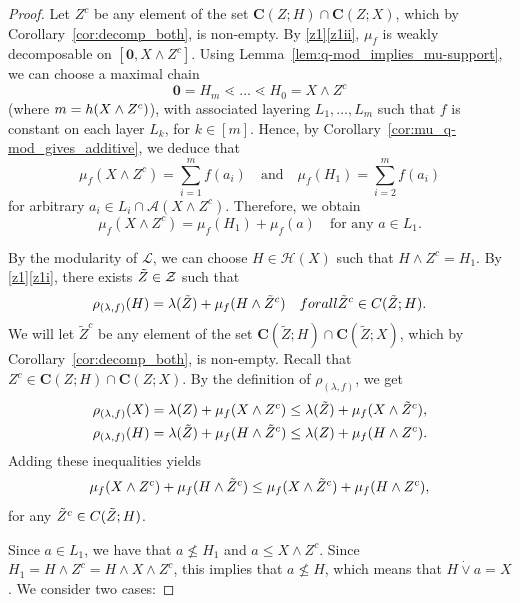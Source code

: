 \documentclass[a4paper,11pt,reqno]{article}
\theoremstyle{definition}
\newcommand{\zero}{{\mathbf{0}}}
\begin{document}
\begin{proof}
    Let $Z^c$ be any element of the set $\mathbf{C}(Z;H)\cap\mathbf{C}(Z;X)$, which by Corollary~\ref{cor:decomp_both}, is non-empty. By \ref{z1}\ref{z1ii}, $\mu_f$ is weakly decomposable on $[\zero,X \wedge Z^c]$. Using Lemma~\ref{lem:q-mod_implies_mu-support}, we can choose a maximal chain 
    \[
    \zero = H_m \lessdot \dots \lessdot H_0 = X\wedge Z^c
    \]
    (where $m=\textup{h}(X\wedge Z^c)$), with associated layering $L_1, \dots, L_m$ such that $f$ is constant on each layer $L_k$, for $k \in [m]$. Hence,  by Corollary~\ref{cor:mu_q-mod_gives_additive}, we deduce that
    \[
    \mu_f(X\wedge Z^c) = \sum_{i=1}^m f(a_i) \quad \text{and}\quad \mu_f(H_1) = \sum_{i=2}^m f(a_i)
    \]
    for arbitrary $a_i\in L_i\cap\mathcal{A}(X\wedge Z^c)$.
    Therefore, we obtain
    \begin{equation}\label{eq:hyper+atom}
        \mu_f(X\wedge Z^c) = \mu_f(H_1) + \mu_f(a) \quad \text{for any } a\in L_1.
    \end{equation}

    By the modularity of $\mathcal{L}$, we can choose $H \in \mathcal{H}(X)$ such that $H\wedge Z^c = H_1$. By \ref{z1}\ref{z1i}, there exists $\Tilde{Z} \in \mathcal{Z}$ such that
    \[
    \rho_{(\lambda,f)}(H) = \lambda(\Tilde{Z}) + \mu_f(H\wedge \Tilde{Z}^c)\quad  \textup{for all } \Tilde{Z}^c\in\textup{\textbf{C}}(\Tilde{Z};H).
    \]
    We will let $\tilde{Z}^c$ be any element of the set $\mathbf{C}(\tilde{Z};H)\cap\mathbf{C}(\tilde{Z};X)$, which by Corollary~\ref{cor:decomp_both}, is non-empty. Recall that $Z^c\in\mathbf{C}(Z;H)\cap\mathbf{C}(Z;X)$. By the definition of $\rho_{(\lambda,f)}$, we get
    \begin{align}
        \rho_{(\lambda,f)}(X) &= \lambda(Z) + \mu_f(X\wedge Z^c) \leq \lambda(\Tilde{Z}) + \mu_f(X\wedge\Tilde{Z}^c),\label{eqs:rho_X}\\
        \rho_{(\lambda,f)}(H) &= \lambda(\Tilde{Z}) + \mu_f(H\wedge\Tilde{Z}^c) \leq \lambda(Z) + \mu_f(H\wedge Z^c).\label{eqs:rho_hyper}
    \end{align}
    Adding these inequalities yields
    \begin{equation}\label{eq:hyper_mu_sum}
        \mu_f(X\wedge Z^c) + \mu_f(H\wedge \Tilde{Z}^c) \leq \mu_f(X\wedge\Tilde{Z}^c) + \mu_f(H\wedge Z^c),
    \end{equation}
    for any $\Tilde{Z}^c\in\textup{\textbf{C}}(\Tilde{Z};H)$.
    
    Since $a\in L_1$, we have that $a \nleq H_1$ and $a\leq X \wedge Z^c$. Since $H_1=H\wedge Z^c=H\wedge X\wedge Z^c$, this implies that $a\nleq H$, which means that $H\dot\vee a=X$.
    We consider two cases:


\end{proof}
\end{document}
